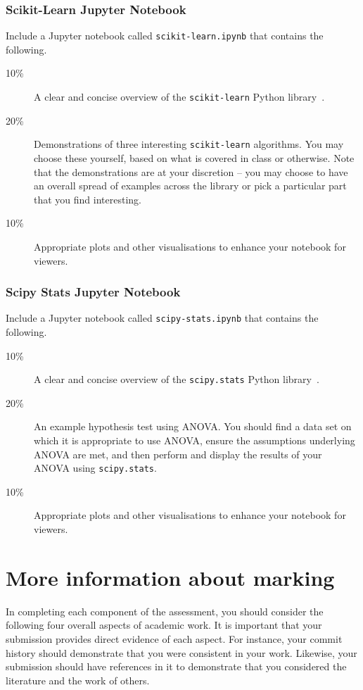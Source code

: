 \documentclass[a4paper, 12pt]{scrartcl}
\begin{document}
  \subsubsection*{Scikit-Learn Jupyter Notebook}
  Include a Jupyter notebook called \texttt{scikit-learn.ipynb} that contains the following.
  \begin{description}
    \item[10\%] A clear and concise overview of the \texttt{scikit-learn} Python library~\cite{scikit-learn}.
    \item[20\%] Demonstrations of three interesting \texttt{scikit-learn} algorithms. You may choose these yourself, based on what is covered in class or otherwise. Note that the demonstrations are at your discretion -- you may choose to have an overall spread of examples across the library or pick a particular part that you find interesting.
    \item[10\%] Appropriate plots and other visualisations to enhance your notebook for viewers.
  \end{description}
  
  \subsubsection*{Scipy Stats Jupyter Notebook}
  Include a Jupyter notebook called \texttt{scipy-stats.ipynb} that contains the following.
  \begin{description}
    \item[10\%] A clear and concise overview of the \texttt{scipy.stats} Python library~\cite{scipy-stats}.
    \item[20\%] An example hypothesis test using ANOVA. You should find a data set on which it is appropriate to use ANOVA, ensure the assumptions underlying ANOVA are met, and then perform and display the results of your ANOVA using \texttt{scipy.stats}.
    \item[10\%] Appropriate plots and other visualisations to enhance your notebook for viewers.
  \end{description}

  \section*{More information about marking}
    In completing each component of the assessment, you should consider the following four overall aspects of academic work.
    It is important that your submission provides direct evidence of each aspect.
    For instance, your commit history should demonstrate that you were consistent in your work.
    Likewise, your submission should have references in it to demonstrate that you considered the literature and the work of others.
  
\end{document}
